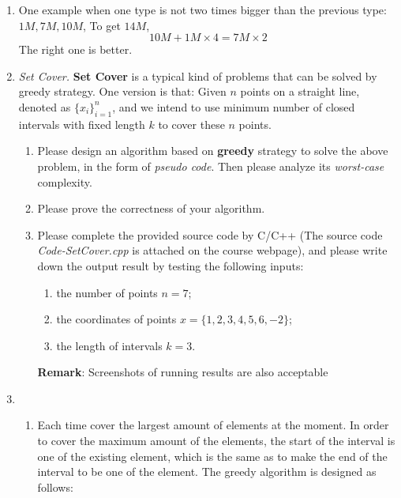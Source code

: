 \documentclass[12pt,a4paper]{article}
\makeatletter
\newtheorem*{solution}{Solution}
\theoremstyle{definition}
\renewenvironment{solution}[1][Solution] {\par\pushQED{\qed}\normalfont\topsep6\p@\@plus6\p@\relax\trivlist\item[\hskip\labelsep\bfseries#1\@addpunct{.}]\ignorespaces}{\popQED\endtrivlist\@endpefalse} \makeatother
\makeatother
\begin{document}
\begin{enumerate}
\begin{solution}
\begin{enumerate}
		   One example when one type is not two times bigger than the previous type: $1M,7M,10M$, To get $14M$,
		   \begin{equation*}
			   10M + 1M\times 4 = 7M \times 2
		   \end{equation*}
		   The right one is better.
	    \end{enumerate}
    \end{solution}
	
    \item \textit{Set Cover.} \textbf{Set Cover} is a typical kind of problems that can be solved by greedy strategy. One version is that: Given $n$ points on a straight line, denoted as $\{x_i\}_{i=1}^n$, and we intend to use minimum number of closed intervals with fixed length $k$ to cover these $n$ points.
    \begin{enumerate}
    	\item Please design an algorithm based on \textbf{greedy} strategy to solve the above problem, in the form of \emph{pseudo code}. Then please analyze its \emph{worst-case} complexity.
    	\item Please prove the correctness of your algorithm.
    	\item Please complete the provided source code by C/C++ {\color{blue}(The source code \emph{Code-SetCover.cpp} is attached on the course webpage)}, and please write down the output result by testing the following inputs: 
    	\begin{enumerate}
    		\item the number of points $n=7$;
    		\item the coordinates of points
    		$x=\{1,2,3,4,5,6,-2\}$;
    		\item the length of intervals
    		$k=3$.
    	\end{enumerate}
        \textbf{Remark}: Screenshots of running results are also acceptable 
    \end{enumerate}
   \begin{solution}
       \begin{enumerate}
		   \item Each time cover the largest amount of elements at the moment. In order to cover the maximum amount of the elements, the start of the interval is one of the existing element, which is the same as to make the end of the interval to be one of the element. The greedy algorithm is designed as follows:
		   

\end{enumerate}
\end{solution}
\end{enumerate}
\end{document}
